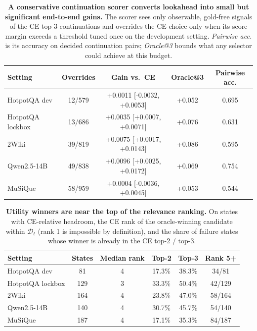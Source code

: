 \begin{table}[t]
\centering
\small
\caption{\textbf{A conservative continuation scorer converts lookahead
into small but significant end-to-end gains.} The scorer sees only
observable, gold-free signals of the CE top-3 continuations and
overrides the CE choice only when its score margin exceeds a threshold
tuned once on the development setting. \emph{Pairwise acc.} is its
accuracy on decided continuation pairs; \emph{Oracle@3} bounds what any
selector could achieve at this budget.}
\label{tab:scorer}
\begin{tabular}{lcccc}
\toprule
\textbf{Setting} & \textbf{Overrides} & \textbf{Gain vs.\ CE} & \textbf{Oracle@3} & \textbf{Pairwise acc.} \\
\midrule
HotpotQA dev & 12/579 & +0.0011 [-0.0032, +0.0053] & +0.052 & 0.695 \\
HotpotQA lockbox & 13/686 & +0.0035 [+0.0007, +0.0071] & +0.076 & 0.631 \\
2Wiki & 39/819 & +0.0075 [+0.0017, +0.0143] & +0.086 & 0.595 \\
Qwen2.5-14B & 49/838 & +0.0096 [+0.0025, +0.0172] & +0.069 & 0.754 \\
MuSiQue & 58/959 & +0.0004 [-0.0036, +0.0045] & +0.053 & 0.544 \\
\bottomrule
\end{tabular}
\end{table}

\begin{table}[t]
\centering
\small
\caption{\textbf{Utility winners are near the top of the relevance
ranking.} On states with CE-relative headroom, the CE rank of the
oracle-winning candidate within $\mathcal{D}_t$ (rank 1 is impossible
by definition), and the share of failure states whose winner is
already in the CE top-2 / top-3.}
\label{tab:winnerrank}
\begin{tabular}{lccccc}
\toprule
\textbf{Setting} & \textbf{States} & \textbf{Median rank} & \textbf{Top-2} & \textbf{Top-3} & \textbf{Rank 5+} \\
\midrule
HotpotQA dev & 81 & 4 & 17.3\% & 38.3\% & 34/81 \\
HotpotQA lockbox & 129 & 3 & 33.3\% & 50.4\% & 42/129 \\
2Wiki & 164 & 4 & 23.8\% & 47.0\% & 58/164 \\
Qwen2.5-14B & 140 & 4 & 30.7\% & 45.7\% & 54/140 \\
MuSiQue & 187 & 4 & 17.1\% & 35.3\% & 84/187 \\
\bottomrule
\end{tabular}
\end{table}

